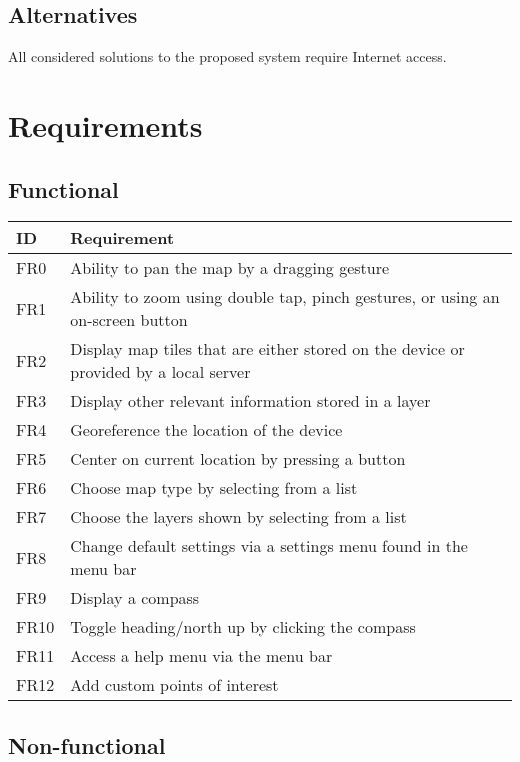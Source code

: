 \documentclass{article}
\begin{document}
\subsection{Alternatives}
All considered solutions to the proposed system require Internet access.

\section{Requirements}

\subsection{Functional}

\begin{tabular}{ | p{.5in} | p{5in} | }
\hline
\textbf{ID} & \textbf{Requirement}\\
\hline
\hline
FR0 & Ability to pan the map by a dragging gesture\\
\hline
FR1 & Ability to zoom using double tap, pinch gestures, or using an on-screen button\\
\hline
FR2 & Display map tiles that are either stored on the device or provided by a local server\\
\hline
FR3 & Display other relevant information stored in a layer\\
\hline
FR4 & Georeference the location of the device\\
\hline
FR5 & Center on current location by pressing a button\\
\hline
FR6 & Choose map type by selecting from a list\\
\hline
FR7 & Choose the layers shown by selecting from a list\\
\hline
FR8 & Change default settings via a settings menu found in the menu bar\\
\hline
FR9 & Display a compass\\
\hline
FR10 & Toggle heading/north up by clicking the compass\\
\hline
FR11 & Access a help menu via the menu bar\\
\hline
FR12 & Add custom points of interest\\
\hline
\end{tabular}

\subsection{Non-functional}
\end{document}
